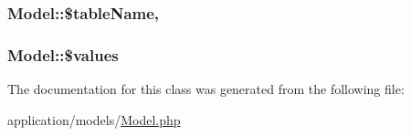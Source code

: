 \hypertarget{class_model_a85c5c0dd8707dbfee443c8c604835822}{
\subsubsection[{\$table\-Name}]{\setlength{\rightskip}{0pt plus 5cm}Model\-::\$table\-Name\hspace{0.3cm}{\ttfamily [static]}, {\ttfamily [protected]}}}\label{class_model_a85c5c0dd8707dbfee443c8c604835822}
\hypertarget{class_model_add234bffacaa1eb042bb3cfe805412ff}{
\subsubsection[{\$values}]{\setlength{\rightskip}{0pt plus 5cm}Model\-::\$values\hspace{0.3cm}{\ttfamily [protected]}}}\label{class_model_add234bffacaa1eb042bb3cfe805412ff}


The documentation for this class was generated from the following file\-:\begin{DoxyCompactItemize}
\item 
application/models/\hyperlink{_model_8php}{Model.\-php}\end{DoxyCompactItemize}
